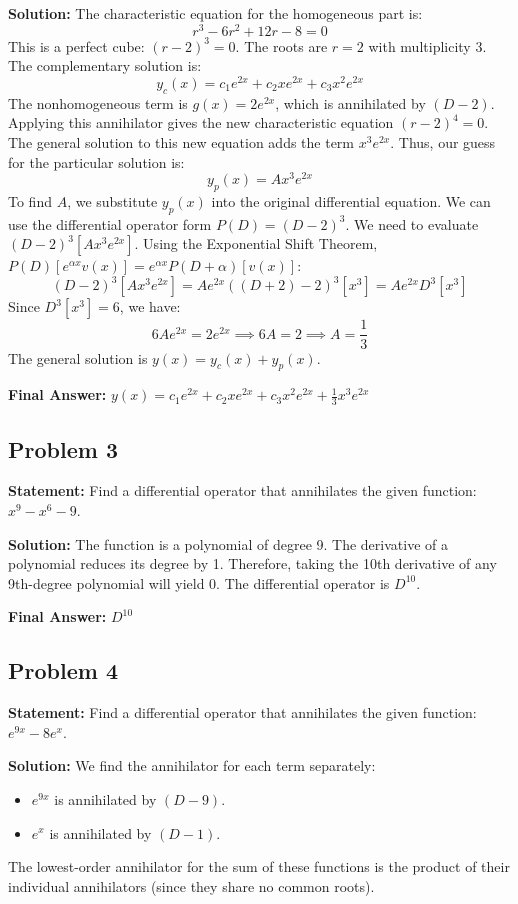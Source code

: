 \documentclass[11pt, a4paper]{article}
\theoremstyle{definition}
\theoremstyle{remark}
\begin{document}
\textbf{Solution:}
The characteristic equation for the homogeneous part is:
\[
r^3 - 6r^2 + 12r - 8 = 0
\]
This is a perfect cube: $(r-2)^3 = 0$. The roots are $r = 2$ with multiplicity 3.
The complementary solution is:
\[
y_c(x) = c_1 e^{2x} + c_2 x e^{2x} + c_3 x^2 e^{2x}
\]
The nonhomogeneous term is $g(x) = 2e^{2x}$, which is annihilated by $(D-2)$. Applying this annihilator gives the new characteristic equation $(r-2)^4 = 0$. The general solution to this new equation adds the term $x^3 e^{2x}$. Thus, our guess for the particular solution is:
\[
y_p(x) = A x^3 e^{2x}
\]
To find $A$, we substitute $y_p(x)$ into the original differential equation. We can use the differential operator form $P(D) = (D-2)^3$. We need to evaluate $(D-2)^3 [A x^3 e^{2x}]$. 
Using the Exponential Shift Theorem, $P(D)[e^{\alpha x} v(x)] = e^{\alpha x} P(D+\alpha)[v(x)]$:
\[
(D-2)^3 [A x^3 e^{2x}] = A e^{2x} ((D+2)-2)^3 [x^3] = A e^{2x} D^3 [x^3]
\]
Since $D^3[x^3] = 6$, we have:
\[
6A e^{2x} = 2e^{2x} \implies 6A = 2 \implies A = \frac{1}{3}
\]
The general solution is $y(x) = y_c(x) + y_p(x)$.

\textbf{Final Answer:} $y(x) = c_1 e^{2x} + c_2 x e^{2x} + c_3 x^2 e^{2x} + \frac{1}{3} x^3 e^{2x}$

\vspace{1em}
\subsection*{Problem 3}
\textbf{Statement:} Find a differential operator that annihilates the given function: $x^9 - x^6 - 9$.

\textbf{Solution:}
The function is a polynomial of degree 9. The derivative of a polynomial reduces its degree by 1. Therefore, taking the 10th derivative of any 9th-degree polynomial will yield 0. The differential operator is $D^{10}$.

\textbf{Final Answer:} $D^{10}$

\vspace{1em}
\subsection*{Problem 4}
\textbf{Statement:} Find a differential operator that annihilates the given function: $e^{9x} - 8e^x$.

\textbf{Solution:}
We find the annihilator for each term separately:
\begin{itemize}
    \item $e^{9x}$ is annihilated by $(D-9)$.
    \item $e^x$ is annihilated by $(D-1)$.
\end{itemize}
The lowest-order annihilator for the sum of these functions is the product of their individual annihilators (since they share no common roots).
\end{document}
